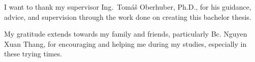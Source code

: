 I want to thank my supervisor Ing.\ Tomáš Oberhuber, Ph.D., for his guidance, advice, and supervision through the work done on creating this bachelor thesis.

My gratitude extends towards my family and friends, particularly Bc. Nguyen Xuan Thang, for encouraging and helping me during my studies, especially in these trying times.